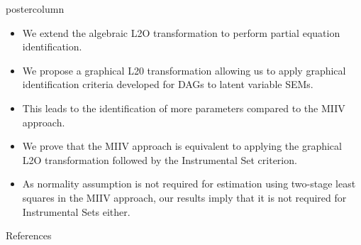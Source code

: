\documentclass{beamer}
\begin{document}
\begin{frame}
\begin{columns}
\begin{column}{0.33\textwidth}
\begin{beamercolorbox}[center]{postercolumn}
\begin{minipage}{.98\textwidth}
{\begin{myblock}{}
		
	\end{myblock}\vfill
	\begin{myblock}{}
		\begin{itemize}
			\item \justifying We extend the algebraic L2O transformation to perform partial equation identification.
			\item \justifying We propose a graphical L20 transformation allowing us to apply graphical identification criteria developed for DAGs to latent variable SEMs.
			\item \justifying This leads to the identification of more parameters compared to the MIIV approach.
			\item \justifying We prove that the MIIV approach is equivalent to applying the graphical L2O transformation followed by the Instrumental Set criterion.
			\item \justifying As normality assumption is not required for estimation using two-stage least squares in the MIIV approach, our results imply 
				that it is not required for Instrumental Sets either.
		\end{itemize}
	\end{myblock}\vfill
	\begin{myblock}{References}
		\footnotesize
		
		
	\vspace{-0.4em}
	\end{myblock}\vfill
		}\end{minipage}\end{beamercolorbox}
	\end{column}
\end{columns}
\end{frame}
\end{document}
